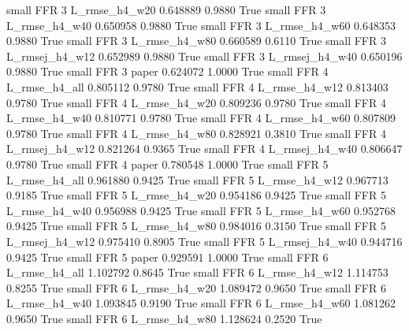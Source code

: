      small      FFR                 3  L_rmse_h4_w20   0.648889      0.9880    True
     small      FFR                 3  L_rmse_h4_w40   0.650958      0.9880    True
     small      FFR                 3  L_rmse_h4_w60   0.648353      0.9880    True
     small      FFR                 3  L_rmse_h4_w80   0.660589      0.6110    True
     small      FFR                 3 L_rmsej_h4_w12   0.652989      0.9880    True
     small      FFR                 3 L_rmsej_h4_w40   0.650196      0.9880    True
     small      FFR                 3          paper   0.624072      1.0000    True
     small      FFR                 4  L_rmse_h4_all   0.805112      0.9780    True
     small      FFR                 4  L_rmse_h4_w12   0.813403      0.9780    True
     small      FFR                 4  L_rmse_h4_w20   0.809236      0.9780    True
     small      FFR                 4  L_rmse_h4_w40   0.810771      0.9780    True
     small      FFR                 4  L_rmse_h4_w60   0.807809      0.9780    True
     small      FFR                 4  L_rmse_h4_w80   0.828921      0.3810    True
     small      FFR                 4 L_rmsej_h4_w12   0.821264      0.9365    True
     small      FFR                 4 L_rmsej_h4_w40   0.806647      0.9780    True
     small      FFR                 4          paper   0.780548      1.0000    True
     small      FFR                 5  L_rmse_h4_all   0.961880      0.9425    True
     small      FFR                 5  L_rmse_h4_w12   0.967713      0.9185    True
     small      FFR                 5  L_rmse_h4_w20   0.954186      0.9425    True
     small      FFR                 5  L_rmse_h4_w40   0.956988      0.9425    True
     small      FFR                 5  L_rmse_h4_w60   0.952768      0.9425    True
     small      FFR                 5  L_rmse_h4_w80   0.984016      0.3150    True
     small      FFR                 5 L_rmsej_h4_w12   0.975410      0.8905    True
     small      FFR                 5 L_rmsej_h4_w40   0.944716      0.9425    True
     small      FFR                 5          paper   0.929591      1.0000    True
     small      FFR                 6  L_rmse_h4_all   1.102792      0.8645    True
     small      FFR                 6  L_rmse_h4_w12   1.114753      0.8255    True
     small      FFR                 6  L_rmse_h4_w20   1.089472      0.9650    True
     small      FFR                 6  L_rmse_h4_w40   1.093845      0.9190    True
     small      FFR                 6  L_rmse_h4_w60   1.081262      0.9650    True
     small      FFR                 6  L_rmse_h4_w80   1.128624      0.2520    True

